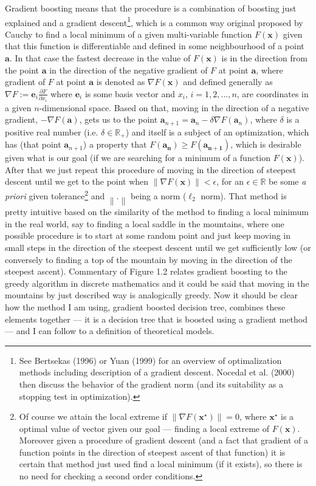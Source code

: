 \documentclass[12pt, twoside,openany]{book} %
\newcommand{\norm}[1]{\left\lVert#1\right\rVert}
\begin{document}
Gradient boosting means that the procedure is a combination of boosting just explained and a gradient descent\footnote{See Bertsekas (1996) or Yuan (1999) for an overview of optimalization methods including description of a gradient descent. Nocedal et al. (2000) then discuss the behavior of the gradient norm (and its suitability as a stopping test in optimization).}, which is a common way original proposed by Cauchy to find a local minimum of a given multi-variable function $F(\mathbf{x})$ given that this function is differentiable and defined in some neighbourhood of a point $\mathbf{a}$. In that case the fastest decrease in the value of $F(\mathbf{x})$ is in the direction from the point $\mathbf{a}$ in the direction of the negative gradient of $F$ at point $\mathbf{a}$, where gradient of $F$ at point $\mathbf{a}$ is denoted as $\nabla F(\mathbf{x})$ and defined generally as $\nabla F:= \mathbf{e}_i \frac{\partial F}{\partial x_i}$ where $\mathbf{e}_i$ is some basis vector and  $x_i$, $i=1, 2,\ldots, n$, are coordinates in a given $n$-dimensional space. Based on that, moving in the direction of a negative gradient, $- \nabla F(\mathbf{a})$, gets us to the point $\mathbf{a}_{n+1} = \mathbf{a}_n-\delta\nabla F(\mathbf{a}_n)$, where $\delta$ is a positive real number (i.e. $\delta \in \mathbb{R}_{+}$) and itself is a subject of an optimization, which has (that point $\mathbf{a}_{n+1}$) a property that $F(\mathbf{a_n})\geq F(\mathbf{a_{n+1}})$, which is desirable given what is our goal (if we are searching for a minimum of a function $F(\mathbf{x})$). After that we just repeat this procedure of moving in the direction of steepest descent until we get to the point when $\norm{\nabla F (\mathbf{x}) } < \epsilon$, for an $\epsilon \in \mathbb{R}$ be some \textit{a priori} given tolerance\footnote{Of course we attain the local extreme if  $\norm{\nabla F (\mathbf{x^\star}) }= 0$, where $\mathbf{x^\star}$ is a optimal value of vector given our goal — finding a local extreme of $F(\mathbf{x})$. Moreover given a procedure of gradient descent (and a fact that gradient of a function points in the direction of steepest ascent of that function) it is certain that method just used find a local minimum (if it exists), so there is no need for checking a second order conditions.} and $\norm{\mathbf{.}}$ being a norm ($\ell_2$ norm). That method is pretty intuitive based on the similarity of the method to finding a local minimum in the real world, say to finding a local saddle in the mountains, where one possible procedure is to start at some random point and just keep moving in small steps in the direction of the steepest descent until we get sufficiently low (or conversely to finding a top of the mountain by moving in the direction of the steepest ascent). Commentary of Figure 1.2 relates gradient boosting to the greedy algorithm in discrete mathematics and it could be said that moving in the mountains by just described way is analogically greedy. \newline
Now it should be clear how the method I am using, gradient boosted decision tree, combines these elements together — it is a decision tree that is boosted using a gradient method — and I can follow to a definition of theoretical models.\newline
\end{document}
